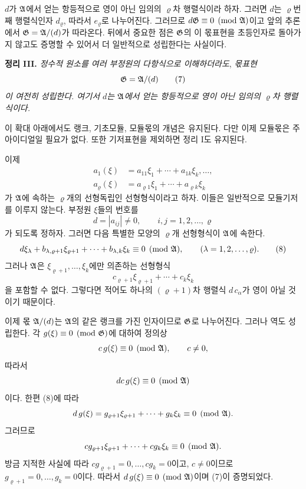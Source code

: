 \(d\)가 \(\mathfrak A\)에서 얻는 항등적으로 영이 아닌 임의의 \(\varrho\)차 행렬식이라 하자. 그러면 \(d\)는 \(\varrho\)번째 행렬식인자 \(d_\varrho\), 따라서 \(e_\varrho\)로 나누어진다. 그러므로 \(d\mathfrak G\equiv0\pmod{\mathfrak A}\)이고 앞의 추론에서 \(\mathfrak G=\mathfrak A/(d)\)가 따라온다. 뒤에서 중요한 점은 \(\mathfrak G\)의 이 몫표현을 초등인자로 돌아가지 않고도 증명할 수 있어서 더 일반적으로 성립한다는 사실이다.

\medskip
\noindent\textbf{정리 III.} \emph{정수적 원소를 여러 부정원의 다항식으로 이해하더라도}, \emph{몫표현
\begin{equation}
\mathfrak G=\mathfrak A/(d)
\tag{7}
\end{equation}
이 여전히 성립한다. 여기서 \(d\)는 \(\mathfrak A\)에서 얻는 항등적으로 영이 아닌 임의의 \(\varrho\)차 행렬식이다.}

이 확대 아래에서도 랭크, 기초모듈, 모듈몫의 개념은 유지된다. 다만 이제 모듈몫은 주아이디얼일 필요가 없다. 또한 기저표현을 제외하면 정리 I도 유지된다.

이제
\[
\begin{aligned}
a_1(\xi)&=a_{11}\xi_1+\cdots+a_{1k}\xi_k,\ldots,\\
a_\varrho(\xi)&=a_{\varrho1}\xi_1+\cdots+a_{\varrho k}\xi_k
\end{aligned}
\]
가 \(\mathfrak A\)에 속하는 \(\varrho\)개의 선형독립인 선형형식이라고 하자. 이들은 일반적으로 모듈기저를 이루지 않는다. 부정원 \(\xi\)들의 번호를
\[
d=|a_{ij}|\ne0,\qquad i,j=1,2,\ldots,\varrho
\]
가 되도록 정하자. 그러면 다음 특별한 모양의 \(\varrho\)개 선형형식이 \(\mathfrak A\)에 속한다.
\begin{equation}
d\xi_\lambda+b_{\lambda,\varrho+1}\xi_{\varrho+1}
+\cdots+b_{\lambda,k}\xi_k\equiv0\pmod{\mathfrak A},
\qquad(\lambda=1,2,\ldots,\varrho).
\tag{8}
\end{equation}
그러나 \(\mathfrak A\)은 \(\xi_{\varrho+1},\ldots,\xi_k\)에만 의존하는 선형형식
\[
c_{\varrho+1}\xi_{\varrho+1}+\cdots+c_k\xi_k
\]
을 포함할 수 없다. 그렇다면 적어도 하나의 \((\varrho+1)\)차 행렬식 \(d\,c_\alpha\)가 영이 아닐 것이기 때문이다.

이제 몫 \(\mathfrak A/(d)\)는 \(\mathfrak A\)의 같은 랭크를 가진 인자이므로 \(\mathfrak G\)로 나누어진다. 그러나 역도 성립한다. 각 \(g(\xi)\equiv0\pmod{\mathfrak G}\)에 대하여 정의상
\[
c\,g(\xi)\equiv0\pmod{\mathfrak A},\qquad c\ne0,
\]
따라서
\[
dc\,g(\xi)\equiv0\pmod{\mathfrak A}
\]
이다. 한편 (8)에 따라
\[
d\,g(\xi)=g_{\varrho+1}\xi_{\varrho+1}+\cdots+g_k\xi_k
\equiv0\pmod{\mathfrak A}.
\]
그러므로
\[
cg_{\varrho+1}\xi_{\varrho+1}+\cdots+cg_k\xi_k\equiv0\pmod{\mathfrak A}.
\]
방금 지적한 사실에 따라 \(cg_{\varrho+1}=0,\ldots,cg_k=0\)이고, \(c\ne0\)이므로 \(g_{\varrho+1}=0,\ldots,g_k=0\)이다. 따라서 \(d\,g(\xi)\equiv0\pmod{\mathfrak A}\)이며 (7)이 증명되었다.

